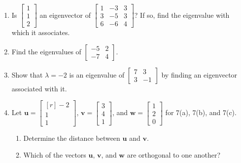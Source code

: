 \documentclass[basic]{inVerba-notes}
\begin{document}
\begin{enumerate}[align=left, leftmargin=0pt, labelindent=\parindent, listparindent=\parindent, labelwidth=0pt, itemindent=!]
  \item {} Is \(\begin{bmatrix}1\\1\\2\end{bmatrix}\) an eigenvector of \(\begin{bmatrix}1 & -3 & 3\\3 & -5 & 3\\6 & -6 & 4\end{bmatrix}\)?  If so, find the eigenvalue with which it associates.
  
  \item {} Find the eigenvalues of \(\begin{bmatrix}-5 & 2\\-7 & 4\end{bmatrix}\).
  
  \newpage

  \item {} Show that \(\lambda=-2\) is an eigenvalue of \(\begin{bmatrix}7 & 3\\3 & -1\end{bmatrix}\) by finding an eigenvector associated with it.
  

  \item {} Let \(\bm{u}=\begin{bmatrix*}[r] -2 \\ 1 \\ 1 \end{bmatrix*}\),  \(\bm{v}=\begin{bmatrix} 3 \\ 4 \\ 1 \end{bmatrix}\), and \(\bm{w}=\begin{bmatrix} 1 \\ 2\\ 0 \end{bmatrix}\) for 7(a), 7(b), and 7(c).
  
    \begin{enumerate}
      \item {} Determine the distance between \(\bm{u}\) and \(\bm{v}\).
      
      \item {} Which of the vectors \(\bm{u}\), \(\bm{v}\), and \(\bm{w}\) are orthogonal to one another?
      \vfill
      
      \newpage
      

\end{enumerate}
\end{enumerate}
\end{document}
